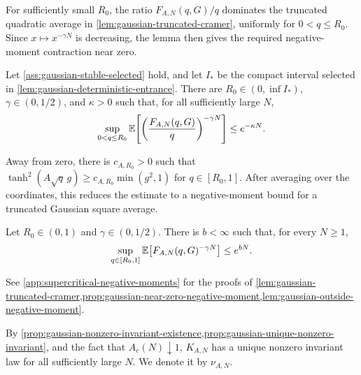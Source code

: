 \documentclass[11pt,reqno,a4paper]{article}
\newcommand{\Ee}{\E}
\begin{document}
For sufficiently small $R_0$, the ratio $F_{A,N}(q,G)/q$ dominates the
truncated quadratic average in \cref{lem:gaussian-truncated-cramer}, uniformly
for $0<q\leq R_0$. Since $x\mapsto x^{-\gamma N}$ is decreasing, the lemma
then gives the required negative-moment contraction near zero.
\begin{proposition}
\label{prop:gaussian-near-zero-negative-moment}
  Let \cref{ass:gaussian-stable-selected} hold, and let $I_\ast$ be the compact
  interval selected in \cref{lem:gaussian-deterministic-entrance}. There are
  $R_0\in(0,\inf I_\ast)$, $\gamma\in(0,1/2)$, and $\kappa>0$ such that, for
  all sufficiently large $N$,
  \begin{equation}\label{eq:gaussian-lyapunov-near-zero-input}
    \sup_{0<q\leq R_0}
    \Ee\left[
      \left(
        \frac{F_{A,N}(q,G)}{q}
      \right)^{-\gamma N}
    \right]
    \leq
    e^{-\kappa N}.
  \end{equation}
\end{proposition}

Away from zero, there is $c_{A,R_0}>0$ such that
$\tanh^2(A\sqrt q\,g)\geq c_{A,R_0}\min(g^2,1)$ for $q\in[R_0,1]$.
After averaging over the coordinates, this reduces the estimate to a
negative-moment bound for a truncated Gaussian square average.
\begin{lemma}
\label{lem:gaussian-outside-negative-moment}
  Let $R_0\in(0,1)$ and $\gamma\in(0,1/2)$. There is $b<\infty$ such that, for
  every $N\geq1$,
  \begin{equation}\label{eq:gaussian-lyapunov-outside-input}
    \sup_{q\in[R_0,1]}
    \Ee\left[
      F_{A,N}(q,G)^{-\gamma N}
    \right]
    \leq
    e^{bN}.
  \end{equation}
\end{lemma}

See \cref{app:supercritical-negative-moments} for the proofs of \cref{lem:gaussian-truncated-cramer,prop:gaussian-near-zero-negative-moment,lem:gaussian-outside-negative-moment}.

By \cref{prop:gaussian-nonzero-invariant-existence,prop:gaussian-unique-nonzero-invariant},
and the fact that $A_c(N)\downarrow1$, $K_{A,N}$ has a unique nonzero
invariant law for all sufficiently large $N$. We denote it by $\nu_{A,N}$.
\end{document}

